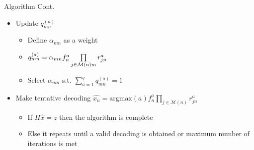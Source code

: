 \documentclass[10pt,ignorenonframetext,]{beamer}
\providecommand{\tightlist}{%
  \setlength{\itemsep}{0pt}\setlength{\parskip}{0pt}}
\begin{document}
\begin{frame}{Algorithm Cont.}
\protect\hypertarget{algorithm-cont.}{}
\begin{itemize}[<+->]
\tightlist
\item
  Update \(q^{(a)}_{mn}\)

  \begin{itemize}[<+->]
  \tightlist
  \item
    Define \(\alpha_{mn}\) as a weight
  \item
    \(q^{(a)}_{mn} = \alpha_{mn} f^a_n\prod\limits_{j\in\mathcal{M}(n)\\m}r^a_{jn}\)
  \item
    Select \(\alpha_{mn}\) s.t. \(\sum_{a=1}^q q^{(a)}_{mn} = 1\)
  \end{itemize}
\item
  Make tentative decoding
  \(\hat{x_n} = \text{argmax}(a)f^a_n\prod\limits_{j\in\mathcal{M}(n)}r^a_{jn}\)

  \begin{itemize}[<+->]
  \tightlist
  \item
    If \(H\hat{x} = z\) then the algorithm is complete
  \item
    Else it repeats until a valid decoding is obtained or maximum number
    of iterations is met
  \end{itemize}
\end{itemize}
\end{frame}
\end{document}
